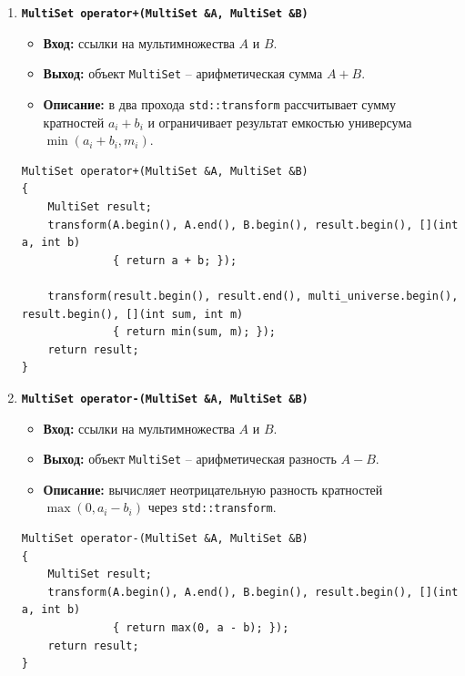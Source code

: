 \documentclass[14pt, a4paper]{extarticle}
\begin{document}
\begin{enumerate}[label=\arabic*., resume]
		\item \textbf{\texttt{MultiSet operator+(MultiSet \&A, MultiSet \&B)}}
		\begin{itemize}[leftmargin=*, noitemsep]
			\item \textbf{Вход:} ссылки на мультимножества $A$ и $B$.
			\item \textbf{Выход:} объект \texttt{MultiSet} -- арифметическая сумма $A + B$.
			\item \textbf{Описание:} в два прохода \texttt{std::transform} рассчитывает сумму кратностей $a_i + b_i$ и ограничивает результат емкостью универсума $\min(a_i + b_i, m_i)$.
		\end{itemize}
		\begin{lstlisting}[caption={Оператор operator+}, label={lst:func_op_plus}]
MultiSet operator+(MultiSet &A, MultiSet &B)
{
    MultiSet result;
    transform(A.begin(), A.end(), B.begin(), result.begin(), [](int a, int b)
              { return a + b; });

    transform(result.begin(), result.end(), multi_universe.begin(), result.begin(), [](int sum, int m)
              { return min(sum, m); });
    return result;
}
		\end{lstlisting}
		
		\item \textbf{\texttt{MultiSet operator-(MultiSet \&A, MultiSet \&B)}}
		\begin{itemize}[leftmargin=*, noitemsep]
			\item \textbf{Вход:} ссылки на мультимножества $A$ и $B$.
			\item \textbf{Выход:} объект \texttt{MultiSet} -- арифметическая разность $A - B$.
			\item \textbf{Описание:} вычисляет неотрицательную разность кратностей $\max(0, a_i - b_i)$ через \texttt{std::transform}.
		\end{itemize}
		\begin{lstlisting}[caption={Оператор operator-}, label={lst:func_op_minus}]
MultiSet operator-(MultiSet &A, MultiSet &B)
{
    MultiSet result;
    transform(A.begin(), A.end(), B.begin(), result.begin(), [](int a, int b)
              { return max(0, a - b); });
    return result;
}
		\end{lstlisting}
		

\end{enumerate}
\end{document}
